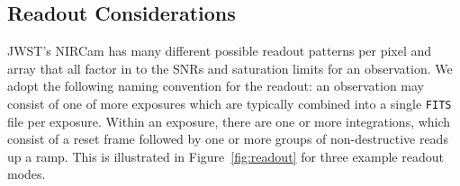 \documentclass[iop]{emulateapj}
\begin{document}




\subsection{Readout Considerations}\label{sec:readout}
JWST's NIRCam has many different possible readout patterns per pixel and array that all factor in to the SNRs and saturation limits for an observation.
We adopt the following naming convention for the readout: an observation may consist of one of more exposures which are typically combined into a single \texttt{FITS} file per exposure.
Within an exposure, there are one or more integrations, which consist of a reset frame followed by one or more groups of non-destructive reads up a ramp.
This is illustrated in Figure~\ref{fig:readout} for three example readout modes.
\end{document}
